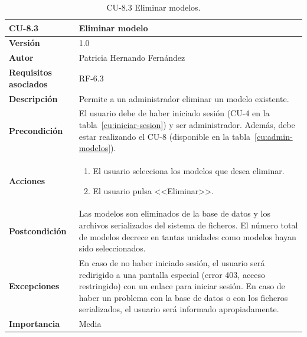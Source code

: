 \begin{table}[p]
	\centering
	\begin{tabularx}{\linewidth}{ p{} p{} }
		\toprule
		\textbf{CU-8.3}    & \textbf{Eliminar modelo}\\
		\toprule
		\textbf{Versión}              & 1.0    \\
		\textbf{Autor}                & Patricia Hernando Fernández \\
		\textbf{Requisitos asociados} & RF-6.3 \\
		\textbf{Descripción}          & Permite a un administrador eliminar un modelo existente.\\
		\textbf{Precondición}         & El usuario debe de haber iniciado sesión (CU-4 en la tabla~\ref{cu:iniciar-sesion}) y ser administrador. Además, debe estar realizando el CU-8 (disponible en la tabla~\ref{cu:admin-modelos}). \\
		\textbf{Acciones}             &
		\begin{enumerate}
			\def\labelenumi{\arabic{enumi}.}
			\tightlist
			\item El usuario selecciona los modelos que desea eliminar.
			\item El usuario pulsa <<Eliminar>>.
		\end{enumerate}\\
		\textbf{Postcondición}        & Las modelos son eliminados de la base de datos y los archivos serializados del sistema de ficheros. El número total de modelos decrece en tantas unidades como modelos hayan sido seleccionados. \\
		\textbf{Excepciones}          & En caso de no haber iniciado sesión, el usuario será redirigido a una pantalla especial (error 403, acceso restringido) con un enlace para iniciar sesión. En caso de haber un problema con la base de datos o con los ficheros serializados, el usuario será informado apropiadamente.\\
		\textbf{Importancia}          & Media \\
		\bottomrule
	\end{tabularx}
	\caption{CU-8.3 Eliminar modelos.}
	\label{cu:eliminar-modelos}
\end{table}


